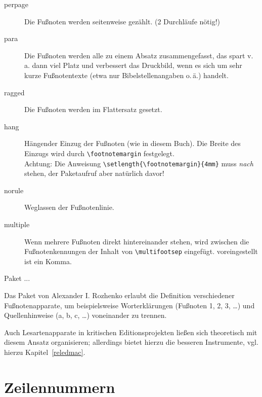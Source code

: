 \begin{description}
 \item[perpage] Die Fußnoten werden seitenweise gezählt. (2 Durchläufe nötig!)
 \item[para] Die Fußnoten werden alle zu einem Absatz zusammengefasst, das spart v.\,a. dann
  viel Platz und verbessert das Druckbild, wenn es sich um sehr kurze Fußnotentexte (etwa nur
  Bibelstellenangaben o.\,ä.) handelt.
 \item[ragged] Die Fußnoten werden im Flattersatz gesetzt.
 \item[hang] Hängender Einzug der Fußnoten (wie in diesem Buch).
  Die Breite des Einzugs wird durch \lstinline/\footnotemargin/ festgelegt.\\
  Achtung: Die Anweisung \lstinline/\setlength{\footnotemargin}{4mm}/ muss \emph{nach}
  \lstinline// stehen, der Paketaufruf aber natürlich davor!
 \item[norule] Weglassen der Fußnotenlinie.
 \item[multiple] Wenn mehrere Fußnoten direkt hintereinander stehen, wird zwischen die
  Fußnotenkennungen der Inhalt von \lstinline/\multifootsep/ eingefügt. voreingestellt ist
  ein Komma.
\end{description}




Paket ...




Das Paket  von Alexander I. Rozhenko
erlaubt die Definition verschiedener Fußnotenapparate, um beispielsweise
Worterklärungen (Fußnoten 1, 2, 3, \ldots ) und Quellenhinweise (a, b, c, \ldots ) voneinander zu trennen.

Auch Lesartenapparate in kritischen Editionsprojekten ließen sich theoretisch 
mit diesem Ansatz organisieren; 
allerdings bietet  hierzu die besseren Instrumente, vgl. hierzu Kapitel~\ref{reledmac}.


\section{Zeilennummern} 
\label{zeilennummer}

